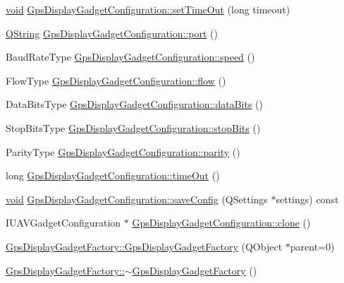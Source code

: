 \begin{DoxyCompactItemize}
\item 
\hyperlink{group___u_a_v_objects_plugin_ga444cf2ff3f0ecbe028adce838d373f5c}{void} \hyperlink{group___g_p_s_gadget_plugin_ga1b7ab91eef34f393bf53bb8f216e40df}{\-Gps\-Display\-Gadget\-Configuration\-::set\-Time\-Out} (long timeout)
\item 
\hyperlink{group___u_a_v_objects_plugin_gab9d252f49c333c94a72f97ce3105a32d}{\-Q\-String} \hyperlink{group___g_p_s_gadget_plugin_ga517cd55a15efad30e5b15a98de8c9767}{\-Gps\-Display\-Gadget\-Configuration\-::port} ()
\item 
\-Baud\-Rate\-Type \hyperlink{group___g_p_s_gadget_plugin_gae316339027f90f81c50cb8b1abffd2bd}{\-Gps\-Display\-Gadget\-Configuration\-::speed} ()
\item 
\-Flow\-Type \hyperlink{group___g_p_s_gadget_plugin_ga971f5af6d2fe2353c15f6b88550339ec}{\-Gps\-Display\-Gadget\-Configuration\-::flow} ()
\item 
\-Data\-Bits\-Type \hyperlink{group___g_p_s_gadget_plugin_gaee5d5b0ab0f7dced62f578c969dc3720}{\-Gps\-Display\-Gadget\-Configuration\-::data\-Bits} ()
\item 
\-Stop\-Bits\-Type \hyperlink{group___g_p_s_gadget_plugin_ga972b1ba46194e9dd5b85289822953a02}{\-Gps\-Display\-Gadget\-Configuration\-::stop\-Bits} ()
\item 
\-Parity\-Type \hyperlink{group___g_p_s_gadget_plugin_ga3a0d09e79d337c15dbc032ae237a8663}{\-Gps\-Display\-Gadget\-Configuration\-::parity} ()
\item 
long \hyperlink{group___g_p_s_gadget_plugin_gae72a22f5fda6f350e9ca08c913bade96}{\-Gps\-Display\-Gadget\-Configuration\-::time\-Out} ()
\item 
\hyperlink{group___u_a_v_objects_plugin_ga444cf2ff3f0ecbe028adce838d373f5c}{void} \hyperlink{group___g_p_s_gadget_plugin_gadeca7dfdc8f1da65123d50b9bb29072c}{\-Gps\-Display\-Gadget\-Configuration\-::save\-Config} (\-Q\-Settings $\ast$settings) const 
\item 
\-I\-U\-A\-V\-Gadget\-Configuration $\ast$ \hyperlink{group___g_p_s_gadget_plugin_ga547748a8ac6a8901cbf20143b3bd9a5d}{\-Gps\-Display\-Gadget\-Configuration\-::clone} ()
\item 
\hyperlink{group___g_p_s_gadget_plugin_ga5c7c8cda8cf65d39d9ae165194901eee}{\-Gps\-Display\-Gadget\-Factory\-::\-Gps\-Display\-Gadget\-Factory} (\-Q\-Object $\ast$parent=0)
\item 
\hyperlink{group___g_p_s_gadget_plugin_ga82537537ded6a09ef83bb5b8480dc521}{\-Gps\-Display\-Gadget\-Factory\-::$\sim$\-Gps\-Display\-Gadget\-Factory} ()

\end{DoxyCompactItemize}
